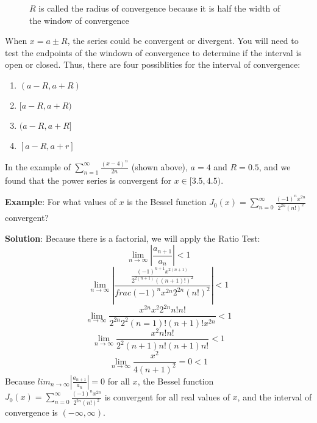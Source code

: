 \begin{figure}[htbp]
\centering
    \caption{$R$ is called the radius of convergence because it is half the 
    width of the window of convergence}
    \label{fig:radiusofconv}
\end{figure}

When $x = a \pm R$, the series could be convergent or divergent. You will need 
to test the endpoints of the windown of convergence to determine if the 
interval is open or closed. Thus, there are four possiblities for the interval 
of convergence:

\begin{enumerate}
\item $(a - R, a + R)$
\item$[a - R, a + R)$
\item$(a - R, a + R]$
\item$[a - R, a + r]$
\end{enumerate}

In the example of $\sum_{n=1}^\infty \frac{(x-4)^n}{2n}$ (shown above), 
$a = 4$ and $R = 0.5$, and we found that the power series is convergent for 
$x \in [3.5, 4.5)$. 

\textbf{Example}: For what values of $x$ is the Bessel function $J_0 (x) = 
\sum_{n=0}^\infty \frac{(-1)^n x^{2n}}{2^{2n}(n!)^2}$ convergent? 

\textbf{Solution}: Because there is a factorial, we will apply the Ratio Test:
$$\lim_{n \to \infty} \left| \frac{a_{n + 1}}{a_n} \right| <  1$$
$$\lim_{n \to \infty} \left| \frac{\frac{(-1)^{n + 1} x^{2(n + 1)}}{2^{2(n + 1
)}((n + 1)!)^2}}{frac{(-1)^n x^{2n}}{2^{2n}(n!)^2}} \right| < 1$$
$$\lim_{n \to \infty} \frac{x^{2n} x^2 2^{2n} n! n!}{2^{2n} 2^2 (n = 1)! (n + 
1)! x^{2n}} < 1$$
$$\lim_{n \to \infty} \frac{x^2 n! n!}{2^2 (n + 1)n! (n + 1)n!} < 1$$
$$\lim_{n \to \infty} \frac{x^2}{4(n + 1)^2} = 0 < 1$$
Because $lim_{n \to \infty} \left| \frac{a_{n + 1}}{a_n} \right| = 0$ for all 
$x$, the Bessel function $J_0 (x) = \sum_{n=0}^\infty \frac{(-1)^n x^{2n}}{2^{
2n}(n!)^2}$ is convergent for all real values of $x$, and the interval of 
convergence is $(-\infty, \infty)$. 

